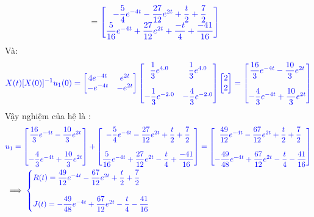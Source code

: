 \documentclass[a4paper]{article}
\begin{document}
\begin{align*}
&=\textcolor{blue}{
\begin{bmatrix} -\dfrac{5}{4}e^{-4t}-\dfrac{27}{12}e^{2t}+ \dfrac{t}{2} +\dfrac{7}{2}\\ \dfrac{5}{16}e^{-4t}+\dfrac{27}{12}e^{2t}+\dfrac{-t}{4}+\dfrac{-41}{16}  \end{bmatrix}}
 \end{align*}
 Và: 
 \begin{align}
 \textcolor{blue}{X(t)[X(0)]^{-1}u_1(0)=\begin{bmatrix} 4e^{-4t} & e^{2t}\\ -e^{-4t} & -e^{2t} \end{bmatrix}\begin{bmatrix} 
 \dfrac{1}{3}e^{4.0} & \dfrac{1}{3}e^{4.0} \\\\ -\dfrac{1}{3}e^{-2.0} & -\dfrac{4}{3}e^{-2.0} \end{bmatrix}\begin{bmatrix} 2 \\ 2 \end{bmatrix} = \begin{bmatrix} \dfrac{16}{3}e^{-4t}  - \dfrac{10}{3}e^{2t}\\\\ -\dfrac{4}{3}e^{-4t}  +\dfrac{10}{3}e^{2t} \end{bmatrix}}
 \end{align}
 Vậy nghiệm của hệ là :
 \begin{align}
  & \textcolor{blue}{  u_1=\begin{bmatrix} \dfrac{16}{3}e^{-4t}  - \dfrac{10}{3}e^{2t}\\\\ -\dfrac{4}{3}e^{-4t}  +\dfrac{10}{3}e^{2t} \end{bmatrix}+\begin{bmatrix} -\dfrac{5}{4}e^{-4t}-\dfrac{27}{12}e^{2t}+ \dfrac{t}{2} +\dfrac{7}{2}\\\\ \dfrac{5}{16}e^{-4t}+\dfrac{27}{12}e^{2t}-\dfrac{t}{4}+\dfrac{-41}{16}  \end{bmatrix}=\begin{bmatrix} \dfrac{49}{12}e^{-4t} -\dfrac{67}{12}e^{2t}+ \dfrac{t}{2} +\dfrac{7}{2} \\\\-\dfrac{49}{48}e^{-4t}  +\dfrac{67}{12}e^{2t}- \dfrac{t}{4}-\dfrac{41}{16} \end{bmatrix}}\\
 &\implies\textcolor{blue}{  \begin{cases}
     \textcolor{blue}
{R(t)= \dfrac{49}{12}e^{-4t} -\dfrac{67}{12}e^{2t}+ \dfrac{t}{2} +\dfrac{7}{2}}\\\\\textcolor{blue}
{J(t)=-\dfrac{49}{48}e^{-4t}  +\dfrac{67}{12}e^{2t}- \dfrac{t}{4}-\dfrac{41}{16} }
\end{cases}}
 \end{align}
\end{document}
